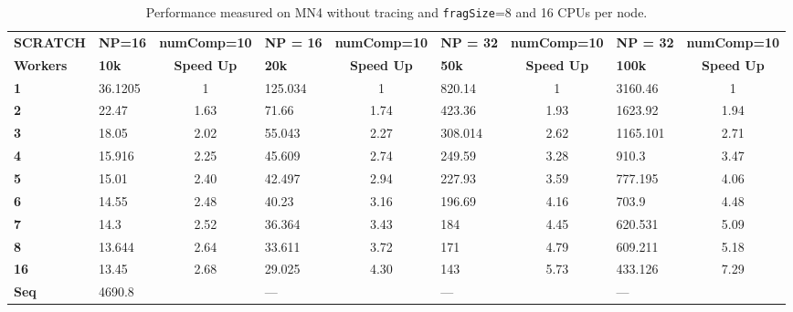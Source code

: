 \documentclass[10pt,journal,compsoc]{IEEEtran}
\let\MYoriglatexcaption\caption
\renewcommand{\caption}[2][\relax]{\MYoriglatexcaption[#2]{#2}}
\begin{document}
\begin{table}[!t]
\centering
\caption{Performance measured on MN4 without tracing and \texttt{fragSize}=8 and 16 CPUs per node.}
\label{performance_table}
\begin{tabular*}{.9\textwidth}{l|lc|lc|lc|lc}
 \textbf{SCRATCH}   & \textbf{NP=16} & \textbf{numComp=10} & \textbf{NP = 16} & \textbf{numComp=10} & \textbf{NP = 32} & \textbf{numComp=10} & \textbf{NP = 32} & \textbf{numComp=10} \\ \cline{2-9} 
\textbf{Workers}     & \textbf{10k}   & \textbf{Speed Up}   & \textbf{20k}     & \textbf{Speed Up}   & \textbf{50k}     & \textbf{Speed Up}   & \textbf{100k}    & \textbf{Speed Up}   \\ \hline
\textbf{1}           & 36.1205        & 1              & 125.034          & 1              & 820.14           & 1              & 3160.46          & 1              \\
\textbf{2}           & 22.47          & 1.63           & 71.66            & 1.74           & 423.36           & 1.93           & 1623.92          & 1.94           \\
\textbf{3}           & 18.05          & 2.02           & 55.043           & 2.27           & 308.014          & 2.62           & 1165.101         & 2.71           \\
\textbf{4}           & 15.916         & 2.25           & 45.609           & 2.74           & 249.59           & 3.28           & 910.3            & 3.47           \\
\textbf{5}           & 15.01          & 2.40           & 42.497           & 2.94           & 227.93           & 3.59           & 777.195          & 4.06           \\
\textbf{6}           & 14.55          & 2.48           & 40.23            & 3.16           & 196.69           & 4.16           & 703.9            & 4.48           \\
\textbf{7}           & 14.3           & 2.52           & 36.364           & 3.43           & 184              & 4.45           & 620.531          & 5.09           \\
\textbf{8}           & 13.644         & 2.64           & 33.611           & 3.72           & 171              & 4.79           & 609.211          & 5.18           \\
\textbf{16}          & 13.45          & 2.68           & 29.025           & 4.30           & 143              & 5.73           & 433.126          & 7.29           \\ \hline
\textbf{Seq} & 4690.8         &                & ---              &                & ---              &                & ---              &               
\end{tabular*}
\end{table}
\end{document}

